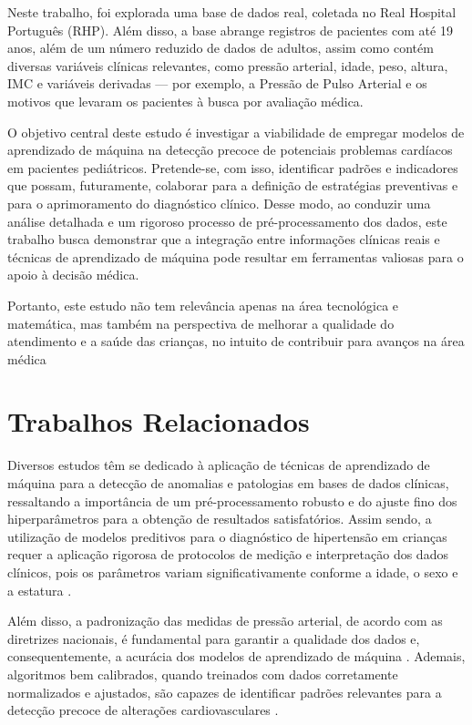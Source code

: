 \documentclass[conference]{IEEEtran}
\begin{document}
Neste trabalho, foi explorada uma base de dados real, coletada no Real Hospital Português (RHP). Além disso, a base abrange registros de pacientes com até 19 anos, além de um número reduzido de dados de adultos, assim como contém diversas variáveis clínicas relevantes, como pressão arterial, idade, peso, altura, IMC e variáveis derivadas — por exemplo, a Pressão de Pulso Arterial e os motivos que levaram os pacientes à busca por avaliação médica.

O objetivo central deste estudo é investigar a viabilidade de empregar modelos de aprendizado de máquina na detecção precoce de potenciais problemas cardíacos em pacientes pediátricos. Pretende-se, com isso, identificar padrões e indicadores que possam, futuramente, colaborar para a definição de estratégias preventivas e para o aprimoramento do diagnóstico clínico. Desse modo, ao conduzir uma análise detalhada e um rigoroso processo de pré-processamento dos dados, este trabalho busca demonstrar que a integração entre informações clínicas reais e técnicas de aprendizado de máquina pode resultar em ferramentas valiosas para o apoio à decisão médica.

Portanto, este estudo não tem relevância apenas na área tecnológica e matemática, mas também na perspectiva de melhorar a qualidade do atendimento e a saúde das crianças, no intuito de contribuir para avanços na área médica



\section{Trabalhos Relacionados}
Diversos estudos têm se dedicado à aplicação de técnicas de aprendizado de máquina para a detecção de anomalias e patologias em bases de dados clínicas, ressaltando a importância de um pré-processamento robusto e do ajuste fino dos hiperparâmetros para a obtenção de resultados satisfatórios. Assim sendo, a utilização de modelos preditivos para o diagnóstico de hipertensão em crianças requer a aplicação rigorosa de protocolos de medição e interpretação dos dados clínicos, pois os parâmetros variam significativamente conforme a idade, o sexo e a estatura \cite{ref:Araujo2024}. 

Além disso, a padronização das medidas de pressão arterial, de acordo com as diretrizes nacionais, é fundamental para garantir a qualidade dos dados e, consequentemente, a acurácia dos modelos de aprendizado de máquina \cite{ref:Feitosa2024}. Ademais, algoritmos bem calibrados, quando treinados com dados corretamente normalizados e ajustados, são capazes de identificar padrões relevantes para a detecção precoce de alterações cardiovasculares \cite{ref:Goodfellow2016}.
\end{document}
